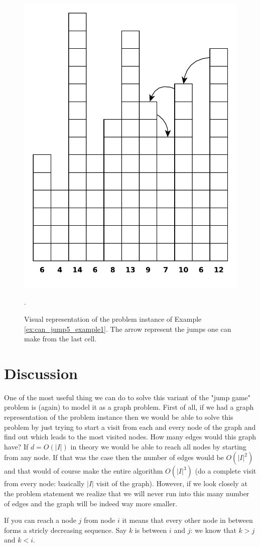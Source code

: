 \begin{figure}
    \centering
    \includegraphics[width=\textwidth]{sources/can_jump/images/can_jump4_example1}
    \caption[]
    {Visual representation of the problem instance  of Example
    \ref{ex:can_jump5_example1}. The arrow represent the jumps one can make from the last cell.}.
    \label{fig:can_jump5_example1}
\end{figure}

\section{Discussion}
\label{can_jump5:sec:discussion}
One of the most useful thing we can do to solve this variant of the "jump game" problem is (again) to model it as a graph problem.
First of all, if we had a graph representation of the problem instance then we would be able to solve this problem by just trying to start a visit from each and every node of the graph and find out which leads to the most visited nodes.
How many edges would this graph have? If $d = O(|I|)$ in theory we would be able to reach all nodes by starting from any node. If that was the case then the number of edges would be $O(|I|^2)$ and that would of course make the entire algorithm $O(|I|^3)$ (do a complete visit from every node: basically $|I|$ visit of the graph).
However, if we look closely at the problem statement we realize that we will never run into this many number of edges and the graph will be indeed way more smaller. 

If you can reach a node $j$ from node $i$ it means that every other node in between forms a stricly decreasing sequence. Say $k$ is between $i$ and $j$: we know that $k > j$ and $k < i$.  
